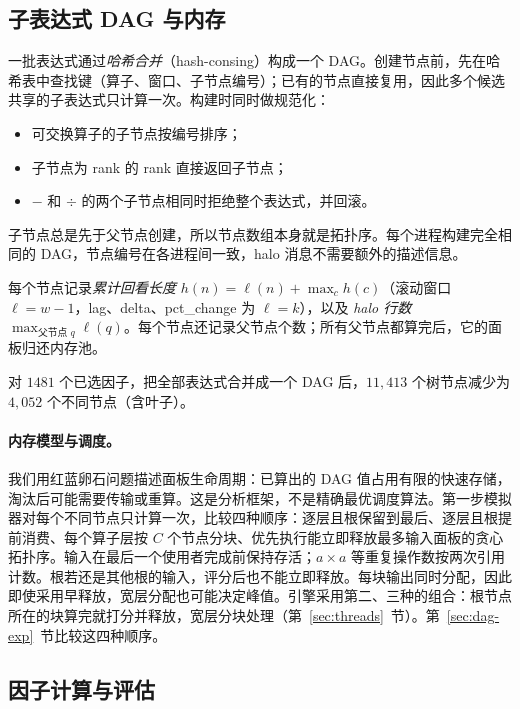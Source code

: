 \documentclass[11pt,a4paper,UTF8,fontset=fandol]{ctexart}
\begin{document}
\subsection{子表达式 DAG 与内存}
\label{sec:dag}
一批表达式通过\emph{哈希合并}（hash-consing）构成一个 DAG。创建节点前，先在哈希表中查找键（算子、窗口、子节点编号）；已有的节点直接复用，因此多个候选共享的子表达式只计算一次。构建时同时做规范化：
\begin{itemize}[nosep]
  \item 可交换算子的子节点按编号排序；
  \item 子节点为 rank 的 rank 直接返回子节点；
  \item $-$ 和 $\div$ 的两个子节点相同时拒绝整个表达式，并回滚。
\end{itemize}
子节点总是先于父节点创建，所以节点数组本身就是拓扑序。每个进程构建完全相同的 DAG，节点编号在各进程间一致，halo 消息不需要额外的描述信息。

每个节点记录\emph{累计回看长度} $h(n) = \ell(n) + \max_{c} h(c)$（滚动窗口 $\ell = w-1$，lag、delta、pct\_change 为 $\ell = k$），以及 \emph{halo 行数} $\max_{\text{父节点 }q} \ell(q)$。每个节点还记录父节点个数；所有父节点都算完后，它的面板归还内存池。

对 $1481$ 个已选因子，把全部表达式合并成一个 DAG 后，$11{,}413$ 个树节点减少为 $4{,}052$ 个不同节点（含叶子）。
\paragraph{内存模型与调度。}
我们用红蓝卵石问题描述面板生命周期：已算出的 DAG 值占用有限的快速存储，淘汰后可能需要传输或重算。这是分析框架，不是精确最优调度算法。第一步模拟器对每个不同节点只计算一次，比较四种顺序：逐层且根保留到最后、逐层且根提前消费、每个算子层按 $C$ 个节点分块、优先执行能立即释放最多输入面板的贪心拓扑序。输入在最后一个使用者完成前保持存活；$a\times a$ 等重复操作数按两次引用计数。根若还是其他根的输入，评分后也不能立即释放。每块输出同时分配，因此即使采用早释放，宽层分配也可能决定峰值。引擎采用第二、三种的组合：根节点所在的块算完就打分并释放，宽层分块处理（第~\ref{sec:threads}~节）。第~\ref{sec:dag-exp}~节比较这四种顺序。

\subsection{因子计算与评估}
\label{sec:fc}
\end{document}
